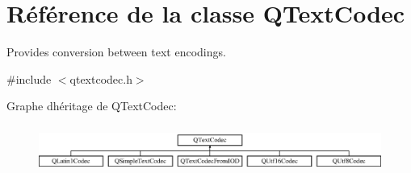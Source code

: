\hypertarget{class_q_text_codec}{}\section{Référence de la classe Q\+Text\+Codec}
\label{class_q_text_codec}


Provides conversion between text encodings.  




{\ttfamily \#include $<$qtextcodec.\+h$>$}

Graphe d\textquotesingle{}héritage de Q\+Text\+Codec\+:\begin{figure}[H]
\begin{center}
\leavevmode
\includegraphics[height=1.588652cm]{class_q_text_codec}
\end{center}
\end{figure}
